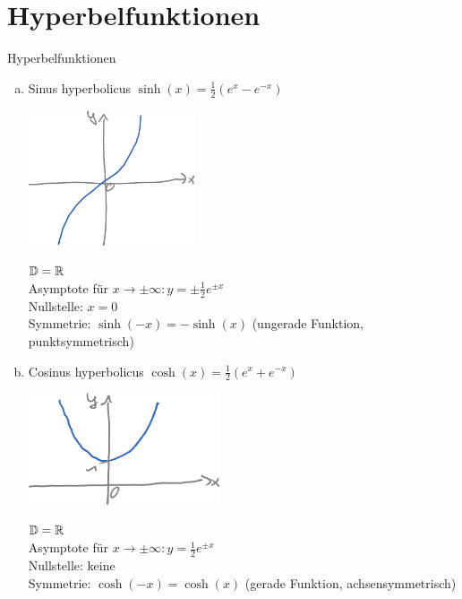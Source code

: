 \section{Hyperbelfunktionen}
\Def Hyperbelfunktionen
\begin{enumerate}[a)]
	\item Sinus hyperbolicus $\sinh(x)=\frac{1}{2}(e^x-e^{-x})$\\
	\begin{minipage}{0.48\linewidth}
		\centering\includegraphics[height=4cm]{Bilder/207}
	\end{minipage}
	\begin{minipage}{0.48\linewidth}
		$\mathbb{D}=\mathbb{R}$\\
		Asymptote für $x\to\pm\infty:y=\pm\frac{1}{2}e^{\pm x}$\\
		Nullstelle: $x=0$\\
		Symmetrie: $\sinh(-x)=-\sinh(x)$ (ungerade Funktion, punktsymmetrisch)
	\end{minipage}

	\clearpage
	\item Cosinus hyperbolicus $\cosh(x)=\frac{1}{2}(e^x+e^{-x})$\\
	\begin{minipage}{0.48\linewidth}
		\centering\includegraphics[height=3.3cm]{Bilder/208}
	\end{minipage}
	\begin{minipage}{0.48\linewidth}
		$\mathbb{D}=\mathbb{R}$\\
		Asymptote für $x\to\pm\infty:y=\frac{1}{2}e^{\pm x}$\\
		Nullstelle: keine\\
		Symmetrie: $\cosh(-x)=\cosh(x)$ (gerade Funktion, achsensymmetrisch)
	\end{minipage}
	

\end{enumerate}
